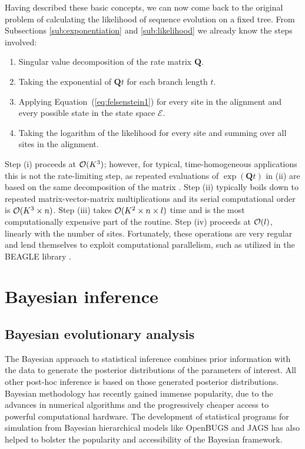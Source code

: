 Having described these basic concepts, we can now come back to the original problem of calculating the likelihood of sequence evolution on a fixed tree.
From Subsections \ref{sub:exponentiation} and \ref{sub:likelihood} we already know the steps involved:

\begin{enumerate}
\item { Singular value decomposition of the rate matrix $\mathbf{Q}$. }
\item { Taking the exponential of $\mathbf{Q}t$ for each branch length $t$. }
\item { Applying Equation~(\ref{eq:felsenstein1}) for every site in the alignment and every possible state in the state space $\mathcal{E}$. }
\item { Taking the logarithm of the likelihood for every site and summing over all sites in the alignment. }
\end{enumerate}

Step (i) proceeds at ${\cal{O}}(K^3)$; however, for typical, time-homogeneous applications this is not the rate-limiting step, as repeated evaluations of $\exp(\mathbf{Q}t)$ in (ii) are based on the same decomposition of the matrix \citep{Suchard2009}. 
Step (ii) typically boils down to repeated matrix-vector-matrix multiplications and its serial computational order is ${\cal{O}}(K^3 \times n)$. 
Step (iii) takes ${\cal{O}}(K^2 \times n \times l)$ time and is the most computationally expensive part of the routine. 
Step (iv) proceeds at ${\cal{O}}(l)$, linearly with the number of sites.
Fortunately, these operations are very regular and lend themselves to exploit computational parallelism, such as utilized in the BEAGLE library \citep{Suchard2009,Ayres2012}.


\section{Bayesian inference\label{sec:bayesian_inference}}

\subsection{Bayesian evolutionary analysis}

The Bayesian approach to statistical inference combines prior information with the data to generate the posterior distributions of the parameters of interest.
All other post-hoc inference is based on those generated posterior distributions.
Bayesian methodology has recently gained immense popularity, due to the advances in numerical algorithms and the progressively cheaper access to powerful computational hardware.
The development of statistical programs for simulation from Bayesian hierarchical models like OpenBUGS \citep{Lunn2009} and JAGS \citep{Plummer2003} has also helped to bolster the popularity and accessibility of the Bayesian framework.

